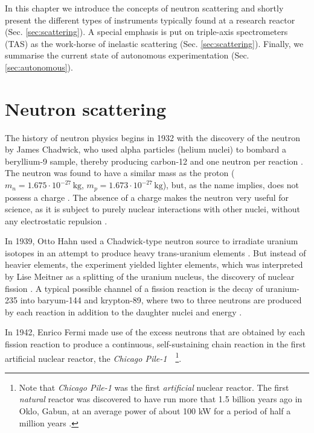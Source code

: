 In this chapter we introduce the concepts of neutron scattering and shortly present the different types of instruments typically found at a research reactor (Sec. \ref{sec:scattering}). A special emphasis is put on triple-axis spectrometers (TAS) as the work-horse of inelastic scattering (Sec. \ref{sec:scattering}). Finally, we summarise the current state of autonomous experimentation (Sec. \ref{sec:autonomous}).



\section{Neutron scattering \label{sec:scattering}}

The history of neutron physics begins in 1932 with the discovery of the neutron by James Chadwick, who used alpha particles (helium nuclei) to bombard a beryllium-9 sample, thereby producing carbon-12 and one neutron per reaction \cite[p.1]{Jacrot2021}. The neutron was found to have a similar mass as the proton ($m_n = 1.675\cdot10^{-27}\,\mathrm{kg}$, $m_p = 1.673\cdot10^{-27}\,\mathrm{kg}$), but, as the name implies, does not possess a charge \cite[p. 2]{Squires2012}. The absence of a charge makes the neutron very useful for science, as it is subject to purely nuclear interactions with other nuclei, without any electrostatic repulsion \cite[p. 1]{Squires2012}.

In 1939, Otto Hahn used a Chadwick-type neutron source to irradiate uranium isotopes in an attempt to produce heavy trans-uranium elements \cite{wiki_fission}. But instead of heavier elements, the experiment yielded lighter elements, which was interpreted by Lise Meitner as a splitting of the uranium nucleus, the discovery of nuclear fission \cite{wiki_fission}. A typical possible channel of a fission reaction is the decay of uranium-235 into baryum-144 and krypton-89, where two to three neutrons are produced by each reaction in addition to the daughter nuclei and energy \cite{wiki_fission}.

In 1942, Enrico Fermi made use of the excess neutrons that are obtained by each fission reaction to produce a continuous, self-sustaining chain reaction in the first artificial nuclear reactor, the \textit{Chicago Pile-1}~\cite[p.1]{Jacrot2021}~\footnote{Note that \textit{Chicago Pile-1} was the first \textit{artificial} nuclear reactor. The first \textit{natural} reactor was discovered to have run more that 1.5 billion years ago in Oklo, Gabun, at an average power of about 100 kW for a period of half a million years \cite{wiki_oklo}.}.

